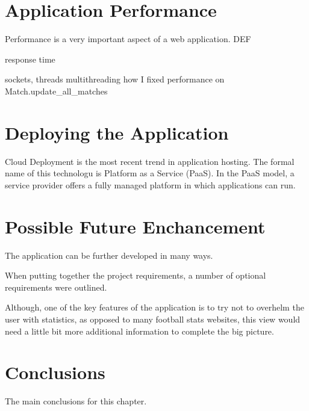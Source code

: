 \section{Application Performance}
\label{sec:applicationperformance}
Performance is a very important aspect of a web application. DEF 

response time 

sockets, threads
multithreading
how I fixed performance on Match.update\_all\_matches

\section{Deploying the Application}
Cloud Deployment is the most recent trend in application hosting. The formal name of this technologu is Platform as a Service (PaaS).  In the PaaS model, a service provider offers a fully managed platform in which applications can run.

\section{Possible Future Enchancement}
\label{sec:enchancement}
The application can be further developed in many ways.  

When putting together the project requirements, a number of optional requirements were outlined. 

Although, one of the key features of the application is to try not to overhelm the user with statistics, as opposed to many football stats websites, this view would need a little bit more additional information to complete the big picture.

\section{Conclusions}
The main conclusions for this chapter.